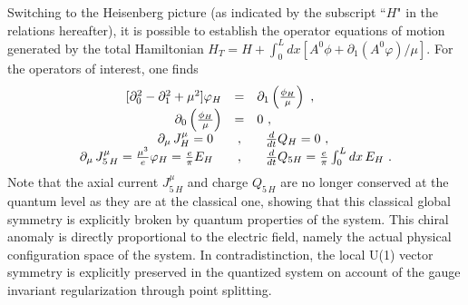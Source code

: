 \documentclass[a4paper,11pt]{article}
\begin{document}
Switching to the Heisenberg picture (as indicated by the subscript ``$H$"
in the relations hereafter), it is possible to establish the 
operator equations of motion generated by the total Hamiltonian
$H_T=H+\int_0^L dx\left[A^0\phi+\partial_1(A^0\varphi)/\mu\right]$.  
For the operators of interest, one finds
\begin{equation}
\begin{array}{r c l}
[\partial^2_0-\partial^2_1+\mu^2]\varphi_H&=&
\partial_1\left(\frac{\phi_H}{\mu}\right)\ ,\\
\partial_0\left(\frac{\phi_H}{\mu}\right)&=&0\ ,\\
\partial_\mu\,J^\mu_H=0\ \ &,&\ \ \frac{d}{dt}Q_H=0\ ,\\
\partial_\mu\,J^\mu_{5\,H}=\frac{\mu^3}{e}\varphi_H=\frac{e}{\pi}E_H\ \ &,&\ \ 
\frac{d}{dt}Q_{5 H}=\frac{e}{\pi}\int_0^L dx\, E_H\ .
\end{array}
\end{equation}
Note that the axial current $J^\mu_{5\,H}$ and charge $Q_{5\,H}$ are no
longer conserved at the quantum level as they are at the classical one,
showing that this classical global symmetry is explicitly broken by
quantum properties of the system. This chiral anomaly is directly
proportional to the electric field, namely the actual physical configuration 
space of the system. In contradistinction, the local U(1) vector symmetry is
explicitly preserved in the quantized system on account of the gauge
invariant regularization through point splitting.
\end{document}
